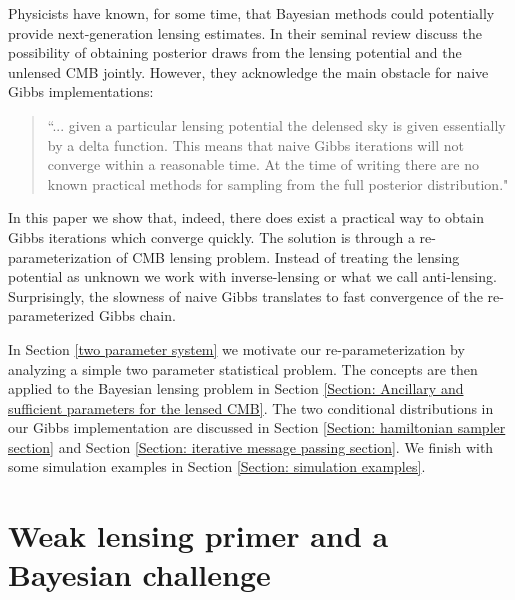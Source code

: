 \documentclass[iop,revtex4,apj,onecolumn]{emulateapj}
\begin{document}
Physicists have known, for some time, that Bayesian methods could potentially provide next-generation lensing estimates. In their seminal review \cite{Lewis20061} discuss the possibility of obtaining posterior draws from the lensing potential and the unlensed CMB jointly. However, they acknowledge the main obstacle for naive Gibbs implementations:
\begin{quote}
``... given a particular lensing potential the delensed sky is given essentially by a delta function.
This means that naive Gibbs iterations will not converge within a reasonable time. At the time of writing there are no known practical methods for sampling from the full posterior distribution."
\end{quote}
In this paper we show that, indeed, there does exist a practical way to obtain Gibbs iterations which converge quickly. The solution is through a re-parameterization of CMB lensing problem. Instead of treating the lensing potential as unknown we work with inverse-lensing or what we call anti-lensing. Surprisingly, the slowness of naive Gibbs translates to fast convergence of the re-parameterized Gibbs chain. 



In Section \ref{two parameter system} we motivate our re-parameterization by analyzing a simple two parameter statistical problem.  The concepts are then applied to the Bayesian lensing problem in Section \ref{Section: Ancillary and sufficient parameters for the lensed CMB}. The two conditional distributions in our Gibbs implementation are discussed in Section \ref{Section: hamiltonian sampler section} and Section \ref{Section: iterative message passing section}. We finish with some  simulation examples in Section \ref{Section: simulation examples}.




%
%
\section{Weak lensing primer and a Bayesian challenge}
\label{primer}
\end{document}
